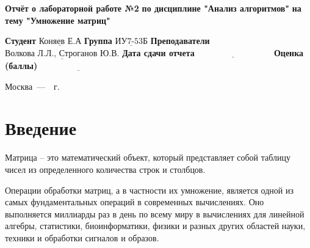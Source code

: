 \documentclass[12pt]{report}
\begin{document}
\begin{titlepage}
		
		\begin{center}
			\noindent\begin{minipage}{1.3\textwidth}\centering
				\Large\textbf{  Отчёт о лабораторной работе №2}\newline
				\textbf{по дисциплине "Анализ алгоритмов"}\newline
				\textbf{на тему "Умножение матриц"}\newline\newline
			\end{minipage}
		\end{center}
		
		\noindent\textbf{Студент} $\underline{\text{Коняев Е.А}}$\newline\newline
		\noindent\textbf{Группа} $\underline{\text{ИУ7-53Б}}$\newline\newline
		\noindent\textbf{Преподаватели} $\underline{\text{Волкова Л.Л., Строганов Ю.В.}}$\newline\newline
		\noindent\textbf{Дата сдачи отчета}$\underline{\text{~~~~~~~~~~~~~~~~~~~~~~~~~~~}}$\newline\newline
		\noindent\textbf{Оценка (баллы)} $\underline{\text{~~~~~~~~~~~~~~~~~~~~~~~~~~~}}$\newline\newline\newline
		
		\begin{center}
			\vfill
			Москва~---~\the\year~г.
		\end{center}
	\end{titlepage}
	
	\setcounter{page}{2}
	\tableofcontents
	
	\newpage
	\chapter*{Введение}
	

Матрица -- это математический объект, который представляет собой таблицу чисел из определенного количества строк и столбцов.

Операции обработки матриц, а в частности их умножение, является одной из самых фундаментальных операций в современных вычислениях. Оно выполняется миллиарды раз в день по всему миру в вычислениях для линейной алгебры, статистики, биоинформатики, физики и разных других областей науки, техники и обработки сигналов и образов.
\end{document}
